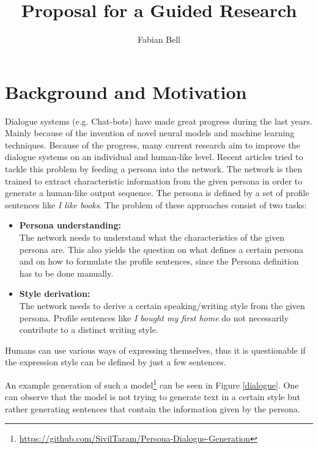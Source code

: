 \documentclass[11pt]{article}
\title{Proposal for a Guided Research}
\author{Fabian Bell}
\date
\begin{document}
\maketitle
\section{Background and Motivation}
Dialogue systems (e.g. Chat-bots) have made great progress during the last years. Mainly because of the invention of novel neural models and machine learning techniques. Because of the progress, many current research aim to improve the dialogue systems on an individual and human-like level. Recent articles \cite[]{DBLP:journals/corr/abs-1901-08149, liu2020impress} tried to tackle this problem by feeding a persona into the network. The network is then trained to extract characteristic information from the given persona in order to generate a human-like output sequence. The persona is defined by a set of profile sentences like \textit{I like books}. The problem of these approaches consist of two tasks:
\begin{itemize}
\item \textbf{Persona understanding:}\\
The network needs to understand what the characteristics of the given persona are. This also yields the question on what defines a certain persona and on how to formulate the profile sentences, since the Persona definition has to be done manually. 
\item \textbf{Style derivation:}\\
The network needs to derive a certain speaking/writing style from the given persona. Profile sentences like \textit{I bought my first home} \cite[]{liu2020impress} do not necessarily contribute to a distinct writing style.
\end{itemize}
Humans can use various ways of expressing themselves, thus it is questionable if the expression style can be defined by just a few sentences. 

An example generation of such a model\footnote{\url{https://github.com/SivilTaram/Persona-Dialogue-Generation}} can be seen in Figure \ref{dialogue}. One can observe that the model is not trying to generate text in a certain style but rather generating sentences that contain the information given by the persona. 
\end{document}
